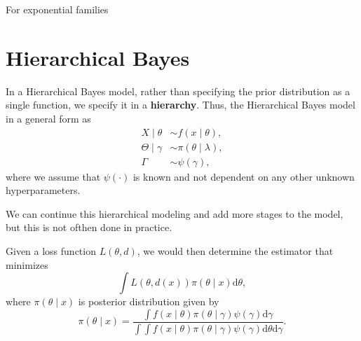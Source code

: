For exponential families

\begin{theorem}{}{}
    
\end{theorem}

\section{Hierarchical Bayes}

In a Hierarchical Bayes model, rather than specifying the prior distribution as a single function, we specify it in a \textbf{hierarchy}. Thus, the Hierarchical Bayes model in a general form as
\begin{equation}
    \begin{aligned}
        X\mid\theta &\sim f\left(x\mid\theta\right),\\
        \Theta\mid\gamma &\sim \pi\left(\theta\mid\lambda\right),\\
        \Gamma &\sim \psi\left(\gamma\right),
    \end{aligned}
    \label{eq:hierarchical-bayes}
\end{equation}
where we assume that $\psi\left(\cdot\right)$ is known and not dependent on any other unknown hyperparameters.

\begin{note}
    We can continue this hierarchical modeling and add more stages to the model, but this is not ofthen done in practice.
\end{note}

Given a loss function $L\left(\theta,d\right)$, we would then determine the estimator that minimizes
\begin{equation}
    \int L\left(\theta,d\left(x\right)\right)\pi\left(\theta\mid x\right)\mathrm{d}\theta,
    \label{eq:hierarchical-bayes-estimator}
\end{equation}
where $\pi\left(\theta\mid x\right)$ is posterior distribution given by
\begin{equation*}
    \pi\left(\theta\mid x\right)=\frac{\int f\left(x\mid\theta\right)\pi\left(\theta\mid\gamma\right)\psi\left(\gamma\right)\mathrm{d}\gamma}{\int\int f\left(x\mid\theta\right)\pi\left(\theta\mid\gamma\right)\psi\left(\gamma\right)\mathrm{d}\theta\mathrm{d}\gamma}.
\end{equation*}

